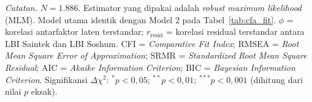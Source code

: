 \begin{table}[H]
    \centering
    \caption{Analisis Sensitivitas CFA Model Dua Faktor dengan dan tanpa Kovarians Residual antara LBI Saintek dan LBI Soshum}
    \label{tab:sens_cfa}
    \begin{spacing}{1.0}
    \end{spacing}
    \vspace{2mm}
    \begin{flushleft}
    \footnotesize\textit{Catatan.} $N = 1.886$. Estimator yang dipakai adalah \textit{robust maximum likelihood} (MLM). Model utama identik dengan Model 2 pada Tabel~\ref{tab:cfa_fit}. $\phi$ = korelasi antarfaktor laten terstandar; $r_{\text{resid}}$ = korelasi residual terstandar antara LBI Saintek dan LBI Soshum. CFI = \textit{Comparative Fit Index}; RMSEA = \textit{Root Mean Square Error of Approximation}; SRMR = \textit{Standardized Root Mean Square Residual}; AIC = \textit{Akaike Information Criterion}; BIC = \textit{Bayesian Information Criterion}. Signifikansi $\Delta\chi^2$: $^{*}p < 0,05$; $^{**}p < 0,01$; $^{***}p < 0,001$ (dihitung dari nilai $p$ eksak).
    \end{flushleft}
\end{table}
